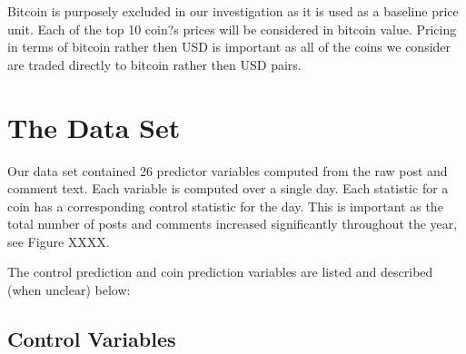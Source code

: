 \documentclass[12pt]{article}
\begin{document}
\indent Bitcoin is purposely excluded in our investigation as it is used as a baseline price unit. Each of the top 10 coin?s prices will be considered in bitcoin value. Pricing in terms of bitcoin rather then USD is important as all of the coins we consider are traded directly to bitcoin rather then USD pairs.




\section{The Data Set}\label{dataset}

	Our data set contained 26 predictor variables computed from the raw post and comment text. Each variable is computed over a single day. Each statistic for a coin has a corresponding control statistic for the day. This is important as the total number of posts and comments increased significantly throughout the year, see Figure XXXX.

The control prediction and coin prediction variables are listed and described (when unclear) below:

\subsection{Control Variables}
\end{document}
